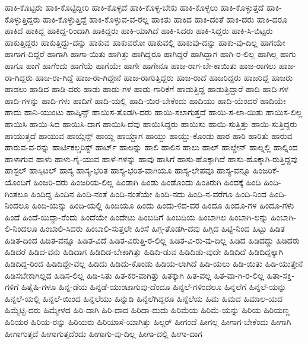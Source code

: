 {ಹಾಕಿ-ಕೊಟ್ಟರು
ಹಾಕಿ-ಕೊಟ್ಟಿದ್ದೀರಿ
ಹಾಕಿ-ಕೊಳ್ಳದೆ
ಹಾಕಿ-ಕೊಳ್ಳ-ಬೇಕು
ಹಾಕಿ-ಕೊಳ್ಳಲು
ಹಾಕಿ-ಕೊಳ್ಳುತ್ತದೆ
ಹಾಕಿ-ಕೊಳ್ಳುತ್ತಿದ್ದರು
ಹಾಕಿ-ಕೊಳ್ಳುತ್ತಿದ್ದೆ
ಹಾಕಿ-ಕೊಳ್ಳುವ-ವ-ರಲ್ಲ
ಹಾಕಿತು
ಹಾಕಿದ
ಹಾಕಿ-ದಂತೆ
ಹಾಕಿ-ದರು
ಹಾಕಿ-ದರೂ
ಹಾಕಿದೆ
ಹಾಕಿದ್ದ
ಹಾಕಿದ್ದ-ರಿಂದಾಗಿ
ಹಾಕಿದ್ದರು
ಹಾಕಿ-ಯಾಗಿದೆ
ಹಾಕಿ-ಸಿದರು
ಹಾಕಿ-ಸಿದ್ದರು
ಹಾಕಿ-ಸಿ-ಬಿಟ್ಟರು
ಹಾಕುತ್ತಿದ್ದರು
ಹಾಕುತ್ತಿದ್ದು-ದನ್ನು
ಹಾಕುವ
ಹಾಕುವರೋ
ಹಾಕುವಲ್ಲಿ
ಹಾಕುವು-ದನ್ನು
ಹಾಕು-ವು-ದಿಲ್ಲ
ಹಾಗಯೇ
ಹಾಗಾಗ-ದಿದ್ದರೆ
ಹಾಗಾಗಿ
ಹಾಗಾ-ಯಿತು
ಹಾಗಿತ್ತು
ಹಾಗಿದ್ದರೂ
ಹಾಗಿದ್ದರೆ
ಹಾಗಿದ್ದಾಗ
ಹಾಗಿ-ರ-ಲಿಲ್ಲ
ಹಾಗಿಲ್ಲ
ಹಾಗು
ಹಾಗೂ
ಹಾಗೆ
ಹಾಗೆಂದು
ಹಾಗೆಯೆ
ಹಾಗೆಯೇ
ಹಾಗೇ
ಹಾಗೇನೂ
ಹಾಜ-ರಾಗ-ಬೇ-ಕಾಯಿತು
ಹಾಜ-ರಾಗಲು
ಹಾಜ-ರಾ-ಗಿದ್ದರು
ಹಾಜ-ರಾ-ಗಿದ್ದೆ
ಹಾಜ-ರಾ-ಗಿದ್ದೇನೆ
ಹಾಜ-ರಾಗುತ್ತಿದ್ದರು
ಹಾಜ-ರಾದೆ
ಹಾಜರಿದ್ದರು
ಹಾಜರಿದ್ದೆ
ಹಾಜರು
ಹಾಡಲು
ಹಾಡಿದ
ಹಾಡಿ-ದರು
ಹಾಡು
ಹಾಡು-ಗಳ
ಹಾಡು-ಗಾರಿಕೆಗೆ
ಹಾಡುತ್ತಿದ್ದ
ಹಾಡುತ್ತಿದ್ದಾರೆ
ಹಾದಿ
ಹಾದಿ-ಗಳ
ಹಾದಿ-ಗಳನ್ನು
ಹಾದಿ-ಗಳು
ಹಾದಿಗೆ
ಹಾದಿ-ಯಲ್ಲಿ
ಹಾದಿ-ಯಿರ-ಬೇಕೆಂದು
ಹಾದಿಯು
ಹಾದಿ-ಯೆಂದರೆ
ಹಾದಿಯೇ
ಹಾದು
ಹಾನಿ-ಯುಂಟು
ಹಾಪ್ಕಿನ್ಸ್
ಹಾಯಿಸ-ತೊಡಗಿ-ದರು
ಹಾಯಿ-ಸಲಾಗುತ್ತದೆ
ಹಾಯಿ-ಸ-ಲಾ-ಯಿತು
ಹಾಯಿಸ-ಲಿಲ್ಲ
ಹಾಯಿಸಿ
ಹಾಯಿ-ಸಿದ
ಹಾಯಿಸಿ-ದಾಗ
ಹಾಯಿಸಿ-ದೆವು
ಹಾಯಿಸಿದ್ದರು
ಹಾಯಿಸು
ಹಾಯಿ-ಸುತ್ತಿತ್ತು
ಹಾಯಿ-ಸುತ್ತಿದ್ದರು
ಹಾಯುತ್ತದೆ
ಹಾಯುವ
ಹಾಯ್ಗೆನ್ಸ್
ಹಾಯ್ದ
ಹಾಯ್ದಾಗ
ಹಾಯ್ದು
ಹಾಯ್ದು-ಕೊಂಡು
ಹಾರ
ಹಾರಿ
ಹಾರಿತು
ಹಾರುವ
ಹಾರುವ-ವ-ರನ್ನು
ಹಾರ್ಟಿಕಲ್ಚರಿಸ್ಟ್
ಹಾರ್ಟ್
ಹಾಲನ್ನು
ಹಾಲಿ
ಹಾಲಿನ
ಹಾಲು
ಹಾಲ್
ಹಾಲ್ಡೇನ್
ಹಾಲ್ನಲ್ಲಿ
ಹಾಲ್ನಿಂದ
ಹಾಳಾಗುವ
ಹಾಳು
ಹಾಳು-ಗೈ-ಯುವ
ಹಾಳೆ-ಗಳನ್ನು
ಹಾವು
ಹಾಸಿಗೆ
ಹಾಸು-ಹೊಕ್ಕಾಗಿದೆ
ಹಾಸು-ಹೊಕ್ಕಾಗಿ-ರುತ್ತಿದ್ದವು
ಹಾಸ್ಟಲ್
ಹಾಸ್ಪಿಟಲ್
ಹಾಸ್ಯ
ಹಾಸ್ಯ-ಭರಿತ
ಹಾಸ್ಯ-ಭರಿತ-ವಾಗಿಯೂ
ಹಾಸ್ಯ-ಲೇಪವೂ
ಹಾಸ್ಯ-ವನ್ನೂ
ಹಿಂಜರಿಕೆ-ಯೊಂದಿಗೆ
ಹಿಂಜರಿ-ದರು
ಹಿಂಜರಿಯ-ಲಿಲ್ಲ
ಹಿಂಡಾಗಿ
ಹಿಂಡು
ಹಿಂಡೊಂದು
ಹಿಂತಿರುಗಿ
ಹಿಂದಕ್ಕೆ
ಹಿಂದಿ
ಹಿಂದಿ-ಗಿಂತಲೂ
ಹಿಂದಿದ್ದ
ಹಿಂದಿನ
ಹಿಂದಿ-ನಂತೆ
ಹಿಂದಿ-ನಂತೆಯೇ
ಹಿಂದಿ-ನದು
ಹಿಂದಿ-ನ-ವರೆಗೂ
ಹಿಂದಿ-ನಿಂದ
ಹಿಂದಿ-ನಿಂದಲೂ
ಹಿಂದಿ-ಯನ್ನು
ಹಿಂದಿ-ಯಲ್ಲಿ
ಹಿಂದಿಯೂ
ಹಿಂದು
ಹಿಂದು-ಳಿದ-ವರ
ಹಿಂದೂ
ಹಿಂದೂ-ಗಳ
ಹಿಂದೂ-ಗಳು
ಹಿಂದೆ
ಹಿಂದೆ-ಯಿದ್ದಾ-ರೆಂದು
ಹಿಂದೆಯೇ
ಹಿಂದೇಟು
ಹಿಂಬದಿಗೆ
ಹಿಂಬದಿಯ
ಹಿಂಬಾಗಿಲ
ಹಿಂಬಾಗಿ-ಲನ್ನು
ಹಿಂಬಾಗಿ-ಲಿ-ನಿಂದಲೂ
ಹಿಂಬಾಲಿ-ಸಿದರು
ಹಿಂಬಾಲಿ-ಸುತ್ತಲೇ
ಹಿಂಸೆ
ಹಿಗ್ಗ-ತೊಡಗಿ-ದವು
ಹಿಗ್ಗಿದ
ಹಿಟ್ಟಿ-ನಿಂದ
ಹಿಟ್ಟು
ಹಿಡಿತ
ಹಿಡಿತ-ದಿಂದ
ಹಿಡಿತ-ವನ್ನೂ
ಹಿಡಿತ-ವಿದೆ
ಹಿಡಿತ-ವಿರುತ್ತಿ-ರ-ಲಿಲ್ಲ
ಹಿಡಿತ-ವಿ-ರು-ವು-ದಿಲ್ಲ
ಹಿಡಿದ
ಹಿಡಿದದ್ದು
ಹಿಡಿದರು
ಹಿಡಿದರೆ
ಹಿಡಿದ-ವನು
ಹಿಡಿದಾಗ
ಹಿಡಿದಿಡ-ಬೇಕಾಗಿತ್ತು
ಹಿಡಿದಿ-ಡುವ
ಹಿಡಿದಿಡು-ವುದೇ
ಹಿಡಿದಿದೆ
ಹಿಡಿದಿದ್ದಕ್ಕಾಗಿ
ಹಿಡಿದಿದ್ದ-ರಿಂದ
ಹಿಡಿದಿದ್ದೇ-ವಲ್ಲ
ಹಿಡಿದು
ಹಿಡಿದು-ಕೊಂಡು
ಹಿಡಿಯ-ಲಾಗಿದೆ
ಹಿಡಿ-ಯಲು
ಹಿಡಿ-ಯಿತು
ಹಿಡಿ-ಯುತ್ತೇನೆ
ಹಿಡಿಸಬೇಕಾಗಿಲ್ಲದ
ಹಿಡಿಸ-ಲಿಲ್ಲ
ಹಿಡಿ-ಸಿತು
ಹಿತ-ಕರ-ವಾಗಿತ್ತು
ಹಿತಕ್ಕಾಗಿ
ಹಿತ-ವಲ್ಲ
ಹಿತ-ವಾ-ಗಿ-ರ-ಲಿಲ್ಲ
ಹಿತಾ-ಸಕ್ತಿ-ಗಳಿಗೆ
ಹಿತೈಷಿ-ಗಳೂ
ಹಿನ್ನ-ಡೆಯ
ಹಿನ್ನಡೆ-ಯುಂಟಾಗುವು-ದೆಂದೂ
ಹಿನ್ನಲೆ-ಗಳಿಂದಲೂ
ಹಿನ್ನಲೆಗೆ
ಹಿನ್ನಲೆ-ಯನ್ನು
ಹಿನ್ನಲೆ-ಯಲ್ಲಿ
ಹಿನ್ನಲೆ-ಯಿಂದ
ಹಿನ್ನಲೆಯು
ಹಿನ್ನುಡಿ
ಹಿನ್ನೆಲೆಗಿದ್ದರೂ
ಹಿನ್ನೆಲೆಯ
ಹಿಮ
ಹಿಮದ
ಹಿಮಾಲ-ಯದ
ಹಿಮ್ಮೆಟ್ಟಿ-ದರು
ಹಿಮ್ಮೇಳದ
ಹಿರಿ-ದಾಗಿ
ಹಿರಿ-ದಾದ
ಹಿರಿದಾ-ದುದು
ಹಿರಿಮೆಯ
ಹಿರಿಮೆ-ಯನ್ನು
ಹಿರಿಯ
ಹಿರಿಯಣ್ಣ
ಹಿರಿಯರ
ಹಿರಿಯ-ರನ್ನು
ಹಿರಿಯರು
ಹಿರಿಯಾಸೆ-ಯಾಗಿತ್ತು
ಹಿಲ್ಗರ್
ಹೀಗಂದೆ
ಹೀಗಲ್ಲ
ಹೀಗಾಗ-ಬೇಕೆಂದು
ಹೀಗಾಗಿ
ಹೀಗಾಗುತ್ತದೆ
ಹೀಗಾಗುತ್ತದೆಂದು
ಹೀಗಾಗು-ವು-ದಿಲ್ಲ
ಹೀಗಾ-ದಲ್ಲಿ
ಹೀಗಾ-ದಾಗ
}
